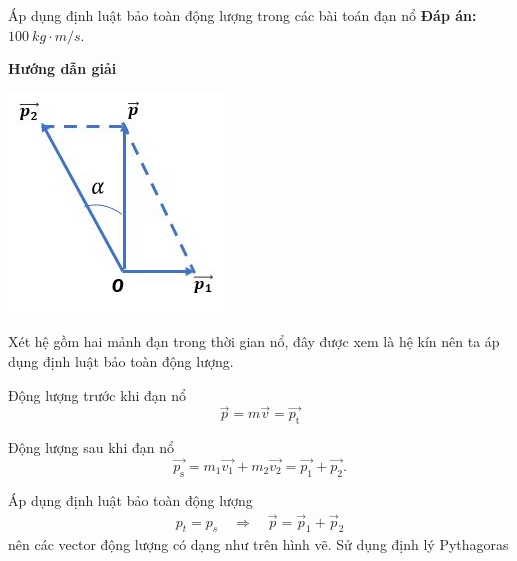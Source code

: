 \begin{dang}{Áp dụng định luật bảo toàn động lượng trong các bài toán đạn nổ}
{		\textbf{Đáp án:} $\SI{100}{kg \cdot m/s}$.
	}
	{	\begin{center}
			\textbf{Hướng dẫn giải}
		\end{center}
		
		\begin{center}
			\includegraphics[scale=0.6]{../figs/VN10-PH-29-L-021-4-1.JPG}
		\end{center}
		Xét hệ gồm hai mảnh đạn trong thời gian nổ, đây được xem là hệ kín nên ta áp dụng định luật bảo toàn động lượng.
		
		Động lượng trước khi đạn nổ
		\begin{equation*}
			\vec{p}=m\vec{v} =\vec{p_{\text{t}}} 
		\end{equation*}
		
		Động lượng sau khi đạn nổ
		\begin{equation*}
			\vec{p_{\text{s}}}=m_1\vec{v_1}+m_2 \vec{v_2} =\vec{p_1} + \vec{p_2}. 
		\end{equation*}
		
		Áp dụng định luật bảo toàn động lượng
		\begin{align*}
			p_t=p_s \quad\Rightarrow\quad \vec{p}=\vec{p}_1+\vec{p}_2
		\end{align*}
		nên các vector động lượng có dạng như trên hình vẽ. Sử dụng định lý Pythagoras
		
}
\end{dang}
